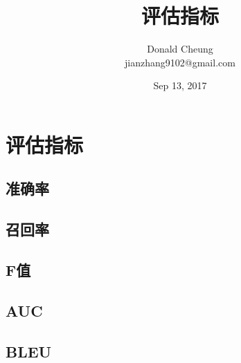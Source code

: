 \documentclass[10pt,a4paper]{ctexbook}
\begin{document}
    \setlength{\baselineskip}{20pt}
    \title{评估指标}
    \author{Donald Cheung\\jianzhang9102@gmail.com}
    \date{Sep 13, 2017}
    \maketitle
    \tableofcontents
\fi

\chapter{评估指标}

\section{准确率}
\section{召回率}
\section{F值}
\section{AUC}
\section{BLEU}

\ifx\mlbook\undefined
    
\end{document}
